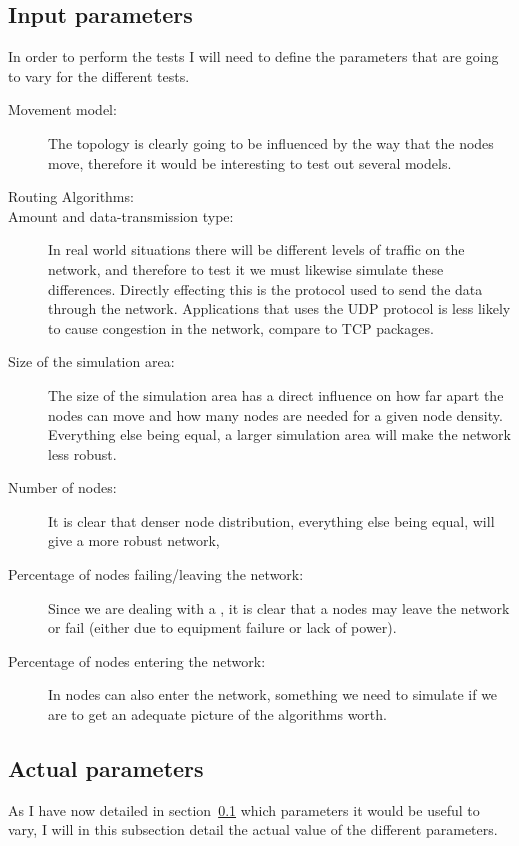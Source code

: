 \subsection{Input parameters}
\label{input_parameters}
In order to perform the tests I will need to define the parameters that are going to vary for the different tests.
\begin{description}
\item[Movement model:] The topology is clearly going to be influenced by the way that the nodes move, therefore it would be interesting to test out several models. 

\item[Routing Algorithms:] 

\item[Amount and data-transmission type:] In real world situations there will be different levels of traffic on the network, and therefore to test it we must likewise simulate these differences. Directly effecting this is the protocol used to send the data through the network. Applications that uses the UDP protocol is less likely to cause congestion in the network, compare to TCP packages.

\item[Size of the simulation area:] The size of the simulation area has a direct influence on how far apart the nodes can move and how many nodes are needed for a given node density. Everything else being equal, a larger simulation area will make the network less robust.

\item[Number of nodes:] It is clear that denser node distribution, everything else being equal, will give a more robust network,

\item[Percentage of nodes failing/leaving the network:] Since we are dealing with a \manet, it is clear that a nodes may leave the network or fail (either due to equipment failure or lack of power). 
\item[Percentage of nodes entering the network:] In \manet nodes can also enter the network, something we need to simulate if we are to get an adequate picture of the algorithms worth.
\end{description}


\subsection{Actual parameters}
As I have now detailed in section~\ref{input_parameters} which parameters it would be useful to vary, I will in this subsection detail the actual value of the different parameters. 

